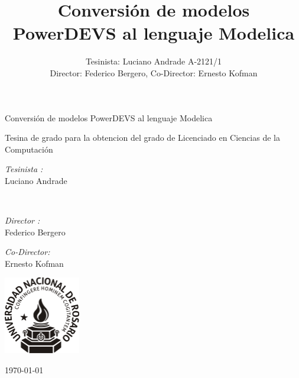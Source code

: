 \documentclass[a4paper,	11pt]{report}
\begin{document}
\renewcommand\floatpagefraction{.9}
\renewcommand\topfraction{.9}
\renewcommand\bottomfraction{.9}
\renewcommand\textfraction{.1}
\setcounter{totalnumber}{50}
\setcounter{topnumber}{50}
\setcounter{bottomnumber}{50}
\newcommand{\quotes}[1]{``#1''}

\title{Conversión de modelos PowerDEVS al lenguaje Modelica}
\author{Tesinista: Luciano Andrade A-2121/1\\ Director: Federico Bergero, Co-Director: Ernesto Kofman} 


\begin{titlepage}
\begin{center}

\huge Conversión de modelos PowerDEVS al lenguaje Modelica

\vfill

Tesina de grado para la obtencion del grado de Licenciado en Ciencias de la Computación

\begin{minipage}[t]{0.4\textwidth}
\begin{flushleft} \large
\emph{Tesinista :}\\
Luciano Andrade
\end{flushleft}
\end{minipage}\\ 
\vfill
\begin{minipage}[t]{0.4\textwidth}
\begin{flushleft} \large
\emph{Director :}\\
Federico Bergero
\end{flushleft}
\end{minipage}%
\begin{minipage}[t]{0.4\textwidth}
\begin{flushright} \large
\emph{Co-Director:} \\
Ernesto Kofman 
\end{flushright}
\end{minipage}

\vfill

\includegraphics[width=0.25\textwidth]{logo-unr}

\vfill

{\large \today}
\end{center}
\end{titlepage}
\end{document}
